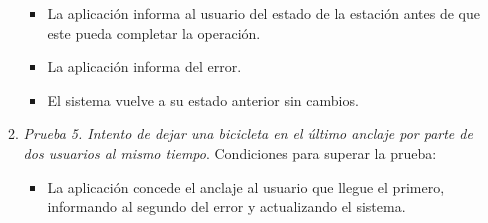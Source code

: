 \begin{itemize}
\begin{enumerate}
		\begin{itemize}
			\item La aplicación informa al usuario del estado de la estación antes de que este pueda completar la operación.
			\item La aplicación informa del error.
			\item El sistema vuelve a su estado anterior sin cambios.
		\end{itemize}
		\item \textit{Prueba 5. Intento de dejar una bicicleta en el último anclaje por parte de dos usuarios al mismo tiempo}. Condiciones para superar la prueba:
		\begin{itemize}
			\item La aplicación concede el anclaje al usuario que llegue el primero, informando al segundo del error y actualizando el sistema.
		\end{itemize}
	\end{enumerate}
	

\end{itemize}
